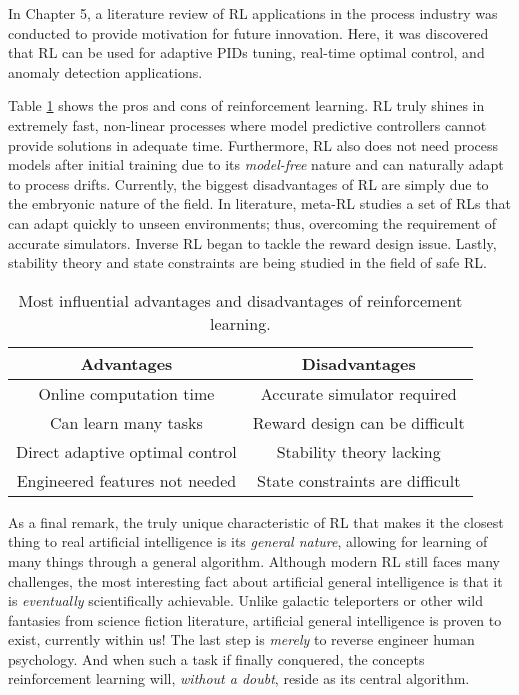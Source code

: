 In Chapter 5, a literature review of RL applications in the process industry was conducted to provide motivation for future innovation. Here, it was discovered that RL can be used for adaptive PIDs tuning, real-time optimal control, and anomaly detection applications.

Table \ref{tab:06adv_disadv} shows the pros and cons of reinforcement learning. RL truly shines in extremely fast, non-linear processes where model predictive controllers cannot provide solutions in adequate time.  Furthermore, RL also does not need process models after initial training due to its \textit{model-free} nature and can naturally adapt to process drifts. Currently, the biggest disadvantages of RL are simply due to the embryonic nature of the field. In literature, meta-RL studies a set of RLs that can adapt quickly to unseen environments; thus, overcoming the requirement of accurate simulators.  Inverse RL began to tackle the reward design issue. Lastly, stability theory and state constraints are being studied in the field of safe RL. 

\begin{table}[H]
\caption{Most influential advantages and disadvantages of reinforcement learning.}
\centering
\begin{tabular}{cc}
\toprule
\textbf{Advantages}	& \textbf{Disadvantages}\\
\midrule
Online computation time  & Accurate simulator required			 \\
Can learn many tasks	   & Reward design can be difficult		 \\
Direct adaptive optimal control       & Stability theory lacking    \\
Engineered features not needed & State constraints are difficult \\
\bottomrule
\end{tabular}
\label{tab:06adv_disadv}
\end{table}

As a final remark, the truly unique characteristic of RL that makes it the closest thing to real artificial intelligence is its \textit{general nature}, allowing for learning of many things through a general algorithm. Although modern RL still faces many challenges, the most interesting fact about artificial general intelligence is that it is \textit{eventually} scientifically achievable. Unlike galactic teleporters or other wild fantasies from science fiction literature, artificial general intelligence is proven to exist, currently within us!  The last step is \textit{merely} to reverse engineer human psychology. And when such a task if finally conquered, the concepts reinforcement learning will, \textit{without a doubt}, reside as its central algorithm.

